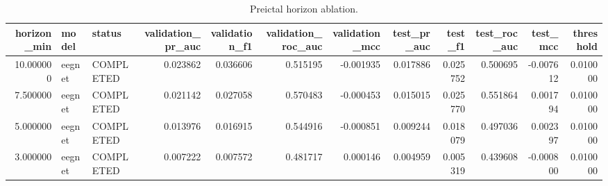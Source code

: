 \begin{table}
\caption{Preictal horizon ablation.}
\label{tab:preictal_horizon_ablation_table}
\begin{tabular}{rllrrrrrrrrr}
\toprule
horizon\_min & model & status & validation\_pr\_auc & validation\_f1 & validation\_roc\_auc & validation\_mcc & test\_pr\_auc & test\_f1 & test\_roc\_auc & test\_mcc & threshold \\
\midrule
10.000000 & eegnet & COMPLETED & 0.023862 & 0.036606 & 0.515195 & -0.001935 & 0.017886 & 0.025752 & 0.500695 & -0.007612 & 0.010000 \\
7.500000 & eegnet & COMPLETED & 0.021142 & 0.027058 & 0.570483 & -0.000453 & 0.015015 & 0.025770 & 0.551864 & 0.001794 & 0.010000 \\
5.000000 & eegnet & COMPLETED & 0.013976 & 0.016915 & 0.544916 & -0.000851 & 0.009244 & 0.018079 & 0.497036 & 0.002397 & 0.010000 \\
3.000000 & eegnet & COMPLETED & 0.007222 & 0.007572 & 0.481717 & 0.000146 & 0.004959 & 0.005319 & 0.439608 & -0.000800 & 0.010000 \\
\bottomrule
\end{tabular}
\end{table}
